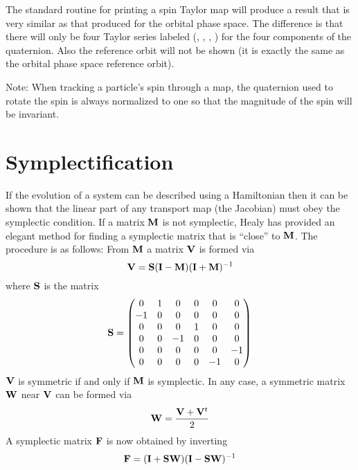 The standard \bmad routine for printing a spin Taylor map will produce a result that is very similar
as that produced for the orbital phase space. The difference is that there will only be four Taylor
series labeled (, , , ) for the four components of the quaternion. Also the reference orbit
will not be shown (it is exactly the same as the orbital phase space reference orbit).

Note: When tracking a particle's spin through a map, the quaternion used to rotate the spin is
always normalized to one so that the magnitude of the spin will be invariant.

\section{Symplectification}
\label{s:symp.method}

If the evolution of a system can be described using a Hamiltonian then
it can be shown that the linear part of any transport map (the Jacobian)
must obey the symplectic condition. If a matrix ${\bf M}$ is not symplectic,
Healy\cite{b:healy} has provided an elegant method for finding a symplectic 
matrix that is ``close'' to ${\bf M}$. The procedure is as follows:
From ${\bf M}$ a matrix ${\bf V}$ is formed via
\begin{equation}
  {\bf V} = {\bf S} ({\bf I} - {\bf M})({\bf I} + {\bf M})^{-1} 
  \label{e:vsimi}
\end{equation}
where ${\bf S}$ is the matrix
\begin{equation}
  {\bf S} = 
  \begin{pmatrix} 
      0 &  1 &  0 &  0 &  0 &  0 \cr
     -1 &  0 &  0 &  0 &  0 &  0 \cr
      0 &  0 &  0 &  1 &  0 &  0 \cr
      0 &  0 & -1 &  0 &  0 &  0 \cr
      0 &  0 &  0 &  0 &  0 & -1 \cr
      0 &  0 &  0 &  0 & -1 &  0 \cr
  \end{pmatrix}
  \label{s0100}
\end{equation}
${\bf V}$ is symmetric if and only if ${\bf M}$ is symplectic. In any case,
a symmetric matrix ${\bf W}$ near ${\bf V}$ can be
formed via
\begin{equation}
  {\bf W} = \frac{{\bf V} + {\bf V}^t}{2}
\end{equation}
A symplectic matrix ${\bf F}$ is now obtained by inverting 
\begin{equation}
  {\bf F} = ({\bf I} + {\bf S} {\bf W}) ({\bf I} - {\bf S} {\bf W})^{-1}
\end{equation}

